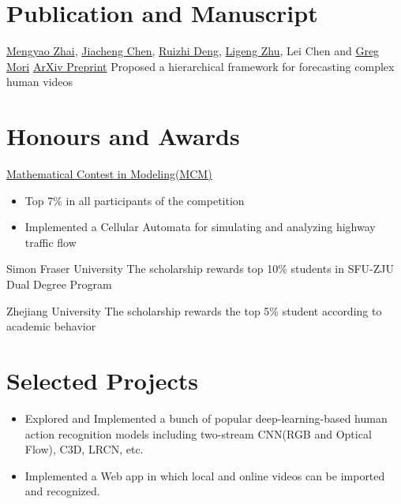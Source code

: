 \documentclass[12pt,a4paper,sans]{moderncv}   %
\begin{document}
\section{Publication and Manuscript}
{}
{\newline \href{https://mzhai.weebly.com/}{Mengyao Zhai}, \underline{\href{http://jcchen.me/}{Jiacheng Chen}}, \href{http://www.sfu.ca/~ruizhid/}{Ruizhi Deng}, \href{https://lzhu.me/}{Ligeng Zhu}, Lei Chen and \href{http://www.cs.sfu.ca/~mori/}{Greg Mori}}
{\newline \href{https://arxiv.org/abs/1712.01955}{ArXiv Preprint}}
{Proposed a hierarchical framework for forecasting complex human videos}

\section{Honours and Awards}
{\href{https://www.comap.com/undergraduate/contests/mcm/}{Mathematical Contest in Modeling(MCM)}}
{}
{}
{
\begin{itemize}
\item Top 7\% in all participants of the competition
\item Implemented a Cellular Automata for simulating and analyzing highway traffic flow
\end{itemize}}

{Simon Fraser University}
{}
{}
{The scholarship rewards top 10\% students in SFU-ZJU Dual Degree Program}

{Zhejiang University}
{}
{}
{The scholarship rewards the top 5\% student according to academic behavior}

\section{Selected Projects}

{%
\begin{itemize}%
\item Explored and Implemented a bunch of popular deep-learning-based human action recognition models including two-stream CNN(RGB and Optical Flow), C3D, LRCN, etc.
%
\item Implemented a Web app in which local and online videos can be imported and recognized.
\end{itemize}
}
\end{document}
